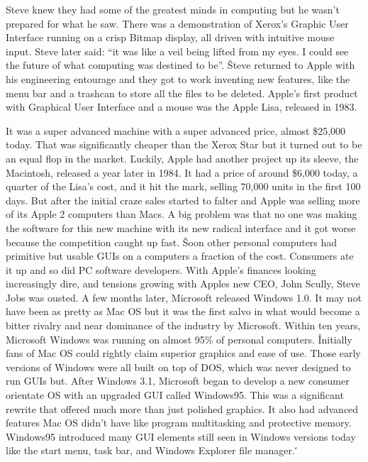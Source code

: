Steve knew they had some of the greatest minds in computing but he wasn't prepared for what he saw. There was a
demonstration of Xerox's Graphic User Interface running on a crisp Bitmap display, all driven with intuitive mouse
input. Steve later said: ``it was like a veil being lifted from my eyes. I could see the future of what computing was
destined to be''. \v

Steve returned to Apple with his engineering entourage and they got to work inventing new features, like the menu bar
and a trashcan to store all the files to be deleted. Apple's first product with Graphical User Interface and a mouse
was the Apple Lisa, released in 1983.


It was a super advanced machine with a super advanced price, almost \$25,000 today. That was significantly cheaper
than the Xerox Star but it turned out to be an equal flop in the market. \v

Luckily, Apple had another project up its sleeve, the Macintosh, released a year later in 1984. It had a price of
around \$6,000 today, a quarter of the Lisa's cost, and it hit the mark, selling 70,000 units in the first 100 days.
But after the initial craze sales started to falter and Apple was selling more of its Apple 2 computers than Macs. A
big problem was that no one was making the software for this new machine with its new radical interface and it got
worse because the competition caught up fast. \v

Soon other personal computers had primitive but usable GUIs on a computers a fraction of the cost. Consumers ate it
up and so did PC software developers. With Apple's finances looking increasingly dire, and tensions growing with
Apples new CEO, John Scully, Steve Jobs was ousted. A few months later, Microsoft released Windows 1.0. It may not
have been as pretty as Mac OS but it was the first salvo in what would become a bitter rivalry and near dominance of
the industry by Microsoft. Within ten years, Microsoft Windows was running on almost 95\% of personal computers. \v

Initially fans of Mac OS could rightly claim superior graphics and ease of use. Those early versions of Windows were
all built on top of DOS, which was never designed to run GUIs but. After Windows 3.1, Microsoft began to develop a
new consumer orientate OS with an upgraded GUI called Windows95. This was a significant rewrite that offered much
more than just polished graphics. It also had advanced features Mac OS didn't have like program multitasking and
protective memory. Windows95 introduced many GUI elements still seen in Windows versions today like the start menu,
task bar, and Windows Explorer file manager. \v

